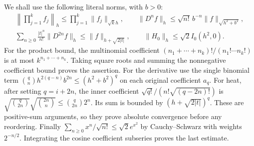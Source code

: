 We shall use the following literal norms, with $b>0$:
\begin{equation}\tag{HAD3}
\begin{gathered}
 \left\|\prod_{j=1}^kf_j\right\|_h
        \le\prod_{j=1}^k\|f_j\|_{\sqrt k h},\qquad
 \|D^nf\|_h\le\sqrt{n!}\,b^{-n}\|f\|_{\sqrt{h^2+b^2}},\\
 \sum_{n\ge0}\frac{|t|^n}{n!}\|D^{2n}f\|_h
          \le\|f\|_{h+\sqrt{2|t|}},\qquad
 \|H_0\|_h\le\sqrt2 I_0(h^2,0).
\end{gathered}
\end{equation}
For the product bound, the multinomial coefficient
$(n_1+\cdots+n_k)!/(n_1!\cdots n_k!)$ is at most
$k^{n_1+\cdots+n_k}$. Taking square roots and summing
the nonnegative coefficient bound proves the assertion.
For the derivative use the single binomial term
$\binom qn h^{2(q-n)}b^{2n}\le(h^2+b^2)^q$ on each
original coefficient $a_q$.
For heat, after setting $q=i+2n$, the inner coefficient
$\sqrt{q!}/(n!\sqrt{(q-2n)!})$ is
$\sqrt{\binom q{2n}}\sqrt{\binom{2n}n}\le\binom q{2n}2^n$.
Its sum is bounded by $(h+\sqrt{2|t|})^q$.
These are positive-sum arguments, so they prove absolute
convergence before any reordering. Finally
$\sum_{n\ge0}x^n/\sqrt{n!}\le\sqrt2e^{x^2}$ by
Cauchy--Schwarz with weights $2^{-n/2}$. Integrating the
cosine coefficient subseries proves the last estimate.


